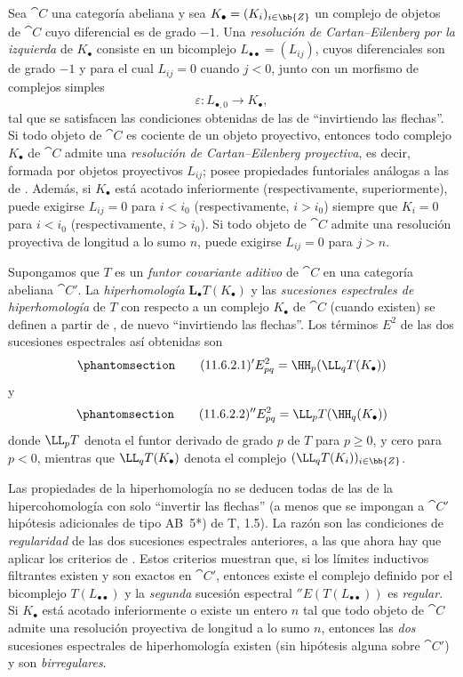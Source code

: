 \documentclass[oneside]{amsart}
\renewcommand{\geq}{\geqslant}
\newcommand{\oldpage}[2][]{{\marginnote{\normalfont\textbf{#1}~|~#2}}\ignorespaces}
\let\EGAOriginalLabel\label
\renewcommand{\label}[1]{\phantomsection\EGAOriginalLabel{#1}}
\begin{document}
\begin{env}[11.6.1]
\label{0.11.6.1}
Sea $\cat{C}$ una categoría abeliana y sea $K_\bullet=(K_i)_{i\in\bb{Z}}$ un complejo de objetos de $\cat{C}$ cuyo diferencial es de grado $-1$.
Una \emph{resolución de Cartan--Eilenberg por la izquierda} de $K_\bullet$ consiste en un bicomplejo $L_{\bullet\bullet}=(L_{ij})$, cuyos diferenciales son de grado $-1$ y para el cual $L_{ij}=0$ cuando $j<0$, junto con un morfismo de complejos simples
\[
  \varepsilon:L_{\bullet,0}\longrightarrow K_\bullet,
\]
tal que se satisfacen las condiciones obtenidas de las de  ``invirtiendo las flechas''.
Si todo objeto de $\cat{C}$ es cociente de un objeto proyectivo, entonces todo complejo $K_\bullet$ de $\cat{C}$ admite una \emph{resolución de Cartan--Eilenberg proyectiva}, es decir, formada por objetos proyectivos $L_{ij}$; posee propiedades funtoriales análogas a las de .
Además, si $K_\bullet$ está acotado inferiormente (respectivamente, superiormente), puede exigirse $L_{ij}=0$ para $i<i_0$ (respectivamente, $i>i_0$) siempre que $K_i=0$ para $i<i_0$ (respectivamente, $i>i_0$).
Si todo objeto de $\cat{C}$ admite una resolución proyectiva de longitud a lo sumo $n$, puede exigirse $L_{ij}=0$ para $j>n$.
\end{env}

\begin{env}[11.6.2]
\label{0.11.6.2}
\oldpage[0\textsubscript{III}]{40}
Supongamos que $T$ es un \emph{funtor covariante aditivo} de $\cat{C}$ en una categoría abeliana $\cat{C}'$.
La \emph{hiperhomología} $\mathbf{L}_\bullet T(K_\bullet)$ y las \emph{sucesiones espectrales de hiperhomología} de $T$ con respecto a un complejo $K_\bullet$ de $\cat{C}$ (cuando existen) se definen a partir de , de nuevo ``invirtiendo las flechas''.
Los términos $E^2$ de las dos sucesiones espectrales así obtenidas son
\[
\label{0.11.6.2.1}
\tag{11.6.2.1}
  {}'E^2_{pq}
  =\HH_p(\LL_qT(K_\bullet))
\]
y
\[
\label{0.11.6.2.2}
\tag{11.6.2.2}
  {}''E^2_{pq}
  =\LL_pT(\HH_q(K_\bullet))
\]
donde $\LL_pT$ denota el funtor derivado de grado $p$ de $T$ para $p\geq0$, y cero para $p<0$, mientras que $\LL_qT(K_\bullet)$ denota el complejo $(\LL_qT(K_i))_{i\in\bb{Z}}$.

Las propiedades de la hiperhomología no se deducen todas de las de la hipercohomología con solo ``invertir las flechas'' (a menos que se impongan a $\cat{C}'$ hipótesis adicionales de tipo AB~5*) de T, 1.5).
La razón son las condiciones de \emph{regularidad} de las dos sucesiones espectrales anteriores, a las que ahora hay que aplicar los criterios de .
Estos criterios muestran que, si los límites inductivos filtrantes existen y son exactos en $\cat{C}'$, entonces existe el complejo definido por el bicomplejo $T(L_{\bullet\bullet})$ y la \emph{segunda} sucesión espectral ${}''E(T(L_{\bullet\bullet}))$ es \emph{regular}.
Si $K_\bullet$ está acotado inferiormente o existe un entero $n$ tal que todo objeto de $\cat{C}$ admite una resolución proyectiva de longitud a lo sumo $n$, entonces las \emph{dos} sucesiones espectrales de hiperhomología existen (sin hipótesis alguna sobre $\cat{C}'$) y son \emph{birregulares}.
\end{env}
\end{document}
